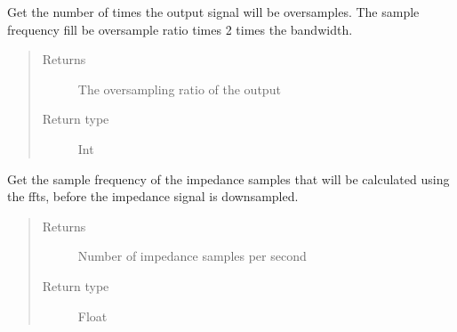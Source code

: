\documentclass[letterpaper,10pt,english]{sphinxmanual}
\begin{document}
\begin{fulllineitems}
\begin{fulllineitems}
\end{fulllineitems}


\begin{fulllineitems}
\label{\detokenize{index:TiePieLCR_settings.TiePieLCR_settings.get_output_oversample_ratio}}
\sphinxAtStartPar
Get the number of times the output signal will be oversamples. The sample frequency fill be oversample ratio times 2 times the bandwidth.
\begin{quote}\begin{description}
\item[{Returns}] \leavevmode
\sphinxAtStartPar
The oversampling ratio of the output

\item[{Return type}] \leavevmode
\sphinxAtStartPar
Int

\end{description}\end{quote}

\end{fulllineitems}


\begin{fulllineitems}
\label{\detokenize{index:TiePieLCR_settings.TiePieLCR_settings.get_output_sample_freq}}
\sphinxAtStartPar
Get the sample frequency of the impedance samples that will be calculated using the ffts, before the impedance signal is downsampled.
\begin{quote}\begin{description}
\item[{Returns}] \leavevmode
\sphinxAtStartPar
Number of impedance samples per second

\item[{Return type}] \leavevmode
\sphinxAtStartPar
Float

\end{description}\end{quote}


\end{fulllineitems}
\end{fulllineitems}
\end{document}
